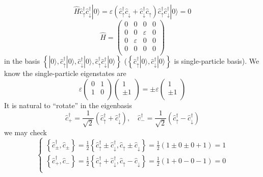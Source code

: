 \[ \hat{H}\hat{c}_{\uparrow}^{\dagger}\hat{c}_{\downarrow}^{\dagger}|0\rangle =\varepsilon \left( \hat{c}_{\uparrow}^{\dagger}\hat{c}_{\downarrow}+\hat{c}_{\downarrow}^{\dagger}\hat{c}_{\uparrow} \right) \hat{c}_{\uparrow}^{\dagger}\hat{c}_{\downarrow}^{\dagger}|0\rangle =0 \]
\[ \hat{H}=\left( \begin{matrix}
	0&		0&		0&		0\\
	0&		0&		\varepsilon&		0\\
	0&		\varepsilon&		0&		0\\
	0&		0&		0&		0\\
\end{matrix} \right) \]
in the basis $\left\{ |0\rangle ,\hat{c}_{\uparrow}^{\dagger}|0\rangle ,\hat{c}_{\downarrow}^{\dagger}|0\rangle ,\hat{c}_{\uparrow}^{\dagger}\hat{c}_{\downarrow}^{\dagger}|0\rangle \right\}$ ($\left\{ \hat{c}_{\uparrow}^{\dagger}|0\rangle ,\hat{c}_{\downarrow}^{\dagger}|0\rangle \right\}$ is single-particle basis). We know the single-particle eigenstates are
\[ \varepsilon \left( \begin{matrix}
	0&		1\\
	1&		0\\
\end{matrix} \right) \left( \begin{array}{c}
	1\\
	\pm 1\\
\end{array} \right) =\pm \varepsilon \left( \begin{array}{c}
	1\\
	\pm 1\\
\end{array} \right)\]
It is natural to ``rotate'' in the eigenbasis
\[ \hat{c}_{+}^{\dagger}=\frac{1}{\sqrt{2}}\left( \hat{c}_{\uparrow}^{\dagger}+\hat{c}_{\downarrow}^{\dagger} \right) ,\quad \hat{c}_{-}^{\dagger}=\frac{1}{\sqrt{2}}\left( \hat{c}_{\uparrow}^{\dagger}-\hat{c}_{\downarrow}^{\dagger} \right) \]
we may check
\[ \begin{cases}
	\left\{ \hat{c}_{\pm}^{\dagger},\hat{c}_{\pm} \right\} =\frac{1}{2}\left\{ \hat{c}_{\uparrow}^{\dagger}\pm \hat{c}_{\downarrow}^{\dagger},\hat{c}_{\uparrow}\pm \hat{c}_{\downarrow} \right\} =\frac{1}{2}\left( 1\pm 0\pm 0+1 \right) =1\\
	\left\{ \hat{c}_{+}^{\dagger},\hat{c}_- \right\} =\frac{1}{2}\left\{ \hat{c}_{\uparrow}^{\dagger}+\hat{c}_{\downarrow}^{\dagger},\hat{c}_{\uparrow}-\hat{c}_{\downarrow} \right\} =\frac{1}{2}\left( 1+0-0-1 \right) =0\\
\end{cases}\]
